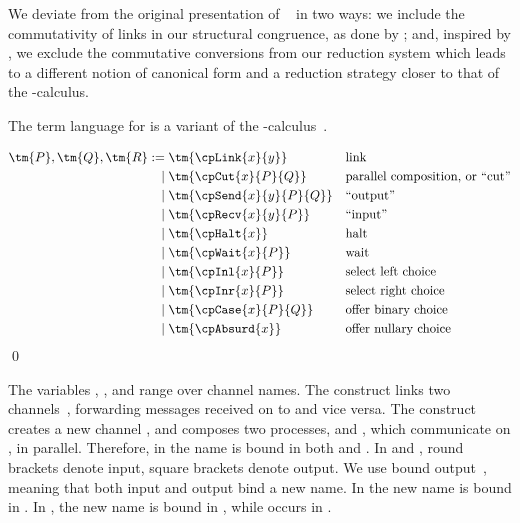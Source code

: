 \documentclass[UKenglish]{llncs}
\begin{document}
We deviate from the original presentation of \cp~\parencite{wadler2012} in two ways:
we include the commutativity of links in our structural congruence, as done by
\textcite{paykin2016}; and, inspired by \textcite{lindley2015semantics}, we
exclude the commutative conversions from our reduction system which leads to a 
different notion of canonical form and a reduction strategy closer to that of
the \textpi-calculus.

The term language for \cp is a variant of the
\textpi-calculus~\parencite{milner1992b}.
\begin{definition}[Terms]\label{def:cp-terms}
  \[\!
    \begin{aligned}
      \tm{P}, \tm{Q}, \tm{R}
           :=& \; \tm{\cpLink{x}{y}}       &&\text{link}
      \\ \mid& \; \tm{\cpCut{x}{P}{Q}}     &&\text{parallel composition, or ``cut''}
      \\ \mid& \; \tm{\cpSend{x}{y}{P}{Q}} &&\text{``output''}
      \\ \mid& \; \tm{\cpRecv{x}{y}{P}}    &&\text{``input''}
      \\ \mid& \; \tm{\cpHalt{x}}          &&\text{halt}
      \\ \mid& \; \tm{\cpWait{x}{P}}       &&\text{wait}
      \\ \mid& \; \tm{\cpInl{x}{P}}        &&\text{select left choice}
      \\ \mid& \; \tm{\cpInr{x}{P}}        &&\text{select right choice}
      \\ \mid& \; \tm{\cpCase{x}{P}{Q}}    &&\text{offer binary choice}
      \\ \mid& \; \tm{\cpAbsurd{x}}        &&\text{offer nullary choice}
    \end{aligned}
  \]  
  \qed
\end{definition}
The variables , ,  and  range over channel names.
The construct  links two
channels~\parencite{sangiorgi1996,boreale1998}, forwarding messages received on
 to  and vice versa.
The construct  creates a new channel , and composes
two processes,  and , which communicate on , in parallel.
Therefore, in  the name  is bound in both  and
.
In  and , round brackets denote
input, square brackets denote output. 
We use bound output~\parencite{sangiorgi1996}, meaning that both input and output
bind a new name. 
In  the new name  is bound in .
In , the new name  is bound in , while
 occurs in .
\end{document}
